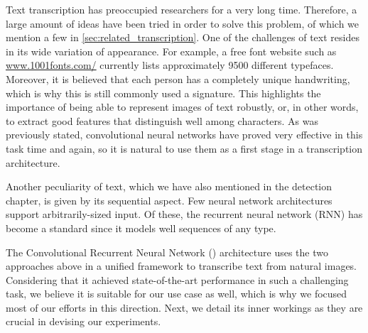 
		Text transcription has preoccupied researchers for a very long time. Therefore, a large amount of ideas have been tried in order to solve this problem, of which we mention a few in \autoref{sec:related_transcription}. One of the challenges of text resides in its wide variation of appearance. For example, a free font website such as \url{www.1001fonts.com/} currently lists approximately 9500 different typefaces. Moreover, it is believed that each person has a completely unique handwriting, which is why this is still commonly used a signature. This highlights the importance of being able to represent images of text robustly, or, in other words, to extract good features that distinguish well among characters. As was previously stated, convolutional neural networks have proved very effective in this task time and again, so it is natural to use them as a first stage in a transcription architecture.

		Another peculiarity of text, which we have also mentioned in the detection chapter, is given by its sequential aspect. Few neural network architectures support arbitrarily-sized input. Of these, the recurrent neural network (RNN) has become a standard since it models well sequences of any type.

		The Convolutional Recurrent Neural Network (\CRNN{}) architecture uses the two approaches above in a unified framework to transcribe text from natural images. Considering that it achieved state-of-the-art performance in such a challenging task, we believe it is suitable for our use case as well, which is why we focused most of our efforts in this direction. Next, we detail its inner workings as they are crucial in devising our experiments.


